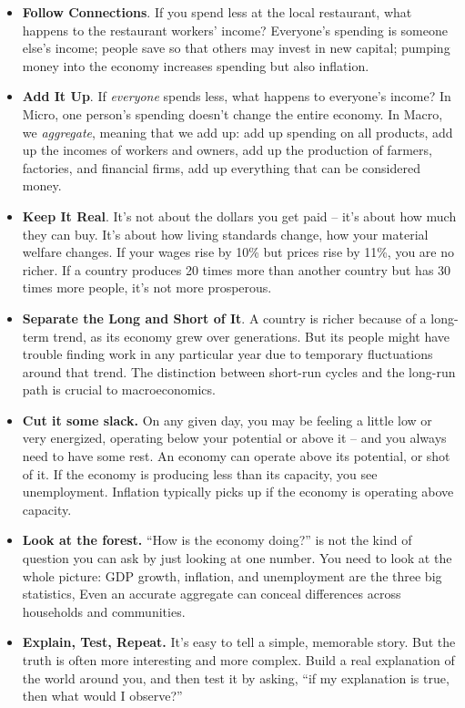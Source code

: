 \documentclass[
  letterpaper,
  DIV=11,
  numbers=noendperiod]{scrreprt}
\begin{document}
\begin{itemize}
\item
  \textbf{Follow Connections}. If you spend less at the local
  restaurant, what happens to the restaurant workers' income? Everyone's
  spending is someone else's income; people save so that others may
  invest in new capital; pumping money into the economy increases
  spending but also inflation.
\item
  \textbf{Add It Up}. If \emph{everyone} spends less, what happens to
  everyone's income? In Micro, one person's spending doesn't change the
  entire economy. In Macro, we \emph{aggregate}, meaning that we add up:
  add up spending on all products, add up the incomes of workers and
  owners, add up the production of farmers, factories, and financial
  firms, add up everything that can be considered money.
\item
  \textbf{Keep It Real}. It's not about the dollars you get paid -- it's
  about how much they can buy. It's about how living standards change,
  how your material welfare changes. If your wages rise by 10\% but
  prices rise by 11\%, you are no richer. If a country produces 20 times
  more than another country but has 30 times more people, it's not more
  prosperous.
\item
  \textbf{Separate the Long and Short of It}. A country is richer
  because of a long-term trend, as its economy grew over generations.
  But its people might have trouble finding work in any particular year
  due to temporary fluctuations around that trend. The distinction
  between short-run cycles and the long-run path is crucial to
  macroeconomics.
\item
  \textbf{Cut it some slack.} On any given day, you may be feeling a
  little low or very energized, operating below your potential or above
  it -- and you always need to have some rest. An economy can operate
  above its potential, or shot of it. If the economy is producing less
  than its capacity, you see unemployment. Inflation typically picks up
  if the economy is operating above capacity.
\item
  \textbf{Look at the forest.} ``How is the economy doing?'' is not the
  kind of question you can ask by just looking at one number. You need
  to look at the whole picture: GDP growth, inflation, and unemployment
  are the three big statistics, Even an accurate aggregate can conceal
  differences across households and communities.
\item
  \textbf{Explain, Test, Repeat.} It's easy to tell a simple, memorable
  story. But the truth is often more interesting and more complex. Build
  a real explanation of the world around you, and then test it by
  asking, ``if my explanation is true, then what would I observe?''
\end{itemize}
\end{document}
